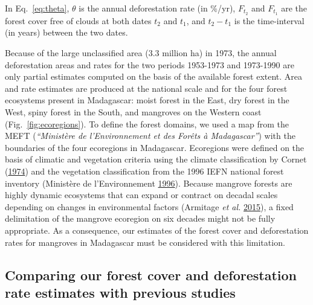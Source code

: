 \documentclass[]{article}
\theoremstyle{definition}
\theoremstyle{definition}
\theoremstyle{definition}
\theoremstyle{remark}
\begin{document}
In Eq.~\eqref{eq:theta}, \(\theta\) is the annual deforestation rate (in
\%/yr), \(F_{t_2}\) and \(F_{t_1}\) are the forest cover free of clouds
at both dates \(t_2\) and \(t_1\), and \(t_2-t_1\) is the time-interval
(in years) between the two dates.

Because of the large unclassified area (3.3 million ha) in 1973, the
annual deforestation areas and rates for the two periods 1953-1973 and
1973-1990 are only partial estimates computed on the basis of the
available forest extent. Area and rate estimates are produced at the
national scale and for the four forest ecosystems present in Madagascar:
moist forest in the East, dry forest in the West, spiny forest in the
South, and mangroves on the Western coast (Fig.~\ref{fig:ecoregions}).
To define the forest domains, we used a map from the MEFT
(\emph{``Ministère de l'Environnement et des Forêts à Madagascar''})
with the boundaries of the four ecoregions in Madagascar. Ecoregions
were defined on the basis of climatic and vegetation criteria using the
climate classification by Cornet
(\protect\hyperlink{ref-Cornet1974}{1974}) and the vegetation
classification from the 1996 IEFN national forest inventory (Ministère
de l'Environnement \protect\hyperlink{ref-IEFN1996}{1996}). Because
mangrove forests are highly dynamic ecosystems that can expand or
contract on decadal scales depending on changes in environmental factors
(Armitage \emph{et al.} \protect\hyperlink{ref-Armitage2015}{2015}), a
fixed delimitation of the mangrove ecoregion on six decades might not be
fully appropriate. As a consequence, our estimates of the forest cover
and deforestation rates for mangroves in Madagascar must be considered
with this limitation.

\hypertarget{comparing-our-forest-cover-and-deforestation-rate-estimates-with-previous-studies}{%
\subsection{Comparing our forest cover and deforestation rate estimates
with previous
studies}\label{comparing-our-forest-cover-and-deforestation-rate-estimates-with-previous-studies}}
\end{document}
